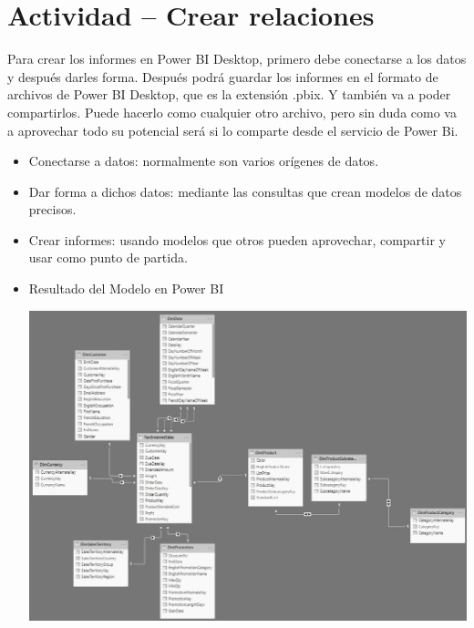  \section{Actividad – Crear relaciones} 
Para crear los informes en Power BI Desktop, primero debe conectarse a los datos y después darles forma. Después podrá guardar los informes en el formato de archivos de Power BI Desktop, que es la extensión .pbix. Y también va a poder compartirlos. Puede hacerlo como cualquier otro archivo, pero sin duda como va a aprovechar todo su potencial será si lo comparte desde el servicio de Power Bi.
\begin{itemize}
	\item Conectarse a datos: normalmente son varios orígenes de datos.
	\item Dar forma a dichos datos: mediante las consultas que crean modelos de datos precisos.
	\item Crear informes: usando modelos que otros pueden aprovechar, compartir y usar como punto de partida.\\
\end{itemize} 

\begin{itemize}
	\item Resultado del Modelo en Power BI 
	\begin{center}
	\includegraphics[width=16cm]{./Imagenes/imgpbi1} 
	\end{center}
\end{itemize} 